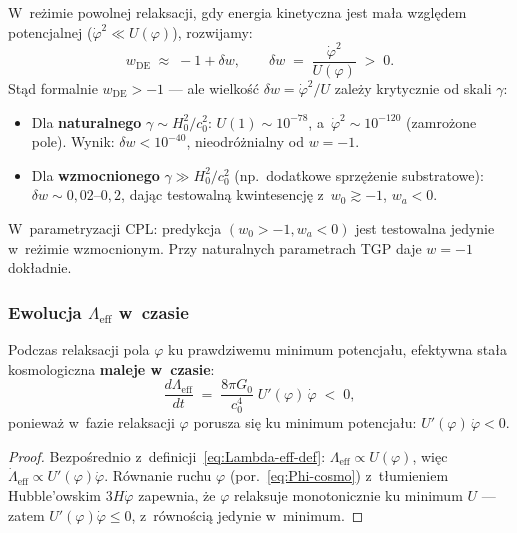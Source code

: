 W~re\.zimie powolnej relaksacji, gdy energia kinetyczna jest
ma\l{}a wzgl\k{e}dem potencjalnej
($\dot{\varphi}^2 \ll U(\varphi)$), rozwijamy:
\begin{equation}\label{eq:wDE-slow}
    w_{\mathrm{DE}} \;\approx\; -1 + \delta w,
    \qquad
    \delta w \;=\; \frac{\dot{\varphi}^2}{U(\varphi)} \;>\; 0.
\end{equation}
St\k{a}d formalnie $w_{\mathrm{DE}} > -1$ --- ale wielko\'s\'c
$\delta w = \dot\varphi^2/U$ zale\.zy krytycznie od skali $\gamma$:
\begin{itemize}[nosep]
  \item Dla \textbf{naturalnego} $\gamma \sim H_0^2/c_0^2$:
        $U(1) \sim 10^{-78}$, a~$\dot\varphi^2 \sim 10^{-120}$
        (zamro\.zone pole). Wynik: $\delta w < 10^{-40}$,
        nieodr\'o\.znialny od $w = -1$.
  \item Dla \textbf{wzmocnionego} $\gamma \gg H_0^2/c_0^2$
        (np.\ dodatkowe sprz\k{e}\.zenie substratowe):
        $\delta w \sim 0{,}02$--$0{,}2$, daj\k{a}c testowaln\k{a}
        kwintesencj\k{e} z~$w_0 \gtrsim -1$, $w_a < 0$.
\end{itemize}
W~parametryzacji CPL: predykcja $(w_0 > -1, w_a < 0)$
jest testowalna jedynie w~re\.zimie wzmocnionym.
Przy naturalnych parametrach TGP daje $w = -1$ dok\l{}adnie.

\subsubsection{Ewolucja $\Lambda_{\mathrm{eff}}$ w~czasie}

\begin{proposition}\label{prop:Lambda-decay}
Podczas relaksacji pola $\varphi$ ku prawdziwemu minimum
potencja\l{}u, efektywna sta\l{}a kosmologiczna
\textbf{maleje w~czasie}:
\begin{equation}\label{eq:Lambda-dot}
  \boxed{
    \frac{d\Lambda_{\mathrm{eff}}}{dt}
    \;=\; \frac{8\pi G_0}{c_0^4}\;U'(\varphi)\,\dot{\varphi}
    \;<\; 0,
  }
\end{equation}
poniewa\.z w~fazie relaksacji $\varphi$ porusza si\k{e} ku
minimum potencja\l{}u: $U'(\varphi)\,\dot{\varphi} < 0$.
\end{proposition}

\begin{proof}
Bezpo\'srednio z~definicji~\eqref{eq:Lambda-eff-def}:
$\Lambda_{\mathrm{eff}} \propto U(\varphi)$, wi\k{e}c
$\dot{\Lambda}_{\mathrm{eff}} \propto U'(\varphi)\dot{\varphi}$.
R\'ownanie ruchu $\varphi$ (por.~\eqref{eq:Phi-cosmo})
z~t\l{}umieniem Hubble'owskim $3H\dot{\varphi}$ zapewnia,
\.ze $\varphi$ relaksuje monotonicznie ku minimum $U$ ---
zatem $U'(\varphi)\dot{\varphi} \leq 0$, z~r\'owno\'sci\k{a}
jedynie w~minimum.
\end{proof}

